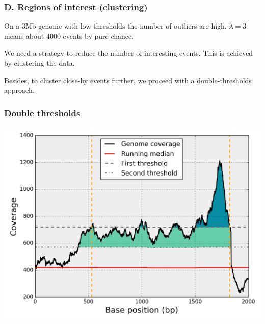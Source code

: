 \documentclass{beamer}
\begin{document}
\begin{frame}
\frametitle{D. Regions of interest (clustering)}

\begin{block}{}
On a 3Mb genome with low thresholds the number of outliers are high. 
$\lambda=3$ means about 4000 events by pure chance.
\end{block}

\begin{block}{}
We need a strategy to reduce the number of interesting events. This is 
achieved by clustering the data.
\end{block}

\begin{block}{}
Besides, to cluster close-by events further, we proceed with a double-thresholds 
approach.
\end{block}
 
\end{frame}


\begin{frame}
 \frametitle{Double thresholds}
\includegraphics[height=0.9\textheight, 
    width=1\textwidth]{images/double_threshold.png}
\end{frame}
\end{document}
